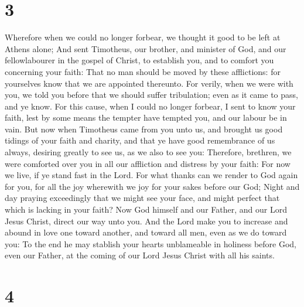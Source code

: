 \hypertarget{section-2}{%
\section{3}\label{section-2}}

 Wherefore when we could no longer forbear, we thought it
good to be left at Athens alone;  And sent Timotheus, our
brother, and minister of God, and our fellowlabourer in the gospel of
Christ, to establish you, and to comfort you concerning your faith:
 That no man should be moved by these afflictions: for
yourselves know that we are appointed thereunto.  For
verily, when we were with you, we told you before that we should suffer
tribulation; even as it came to pass, and ye know.  For
this cause, when I could no longer forbear, I sent to know your faith,
lest by some means the tempter have tempted you, and our labour be in
vain.  But now when Timotheus came from you unto us, and
brought us good tidings of your faith and charity, and that ye have good
remembrance of us always, desiring greatly to see us, as we also to see
you:  Therefore, brethren, we were comforted over you in
all our affliction and distress by your faith:  For now we
live, if ye stand fast in the Lord.  For what thanks can
we render to God again for you, for all the joy wherewith we joy for
your sakes before our God;  Night and day praying
exceedingly that we might see your face, and might perfect that which is
lacking in your faith?  Now God himself and our Father,
and our Lord Jesus Christ, direct our way unto you.  And
the Lord make you to increase and abound in love one toward another, and
toward all men, even as we do toward you:  To the end he
may stablish your hearts unblameable in holiness before God, even our
Father, at the coming of our Lord Jesus Christ with all his saints.

\hypertarget{section-3}{%
\section{4}\label{section-3}}

